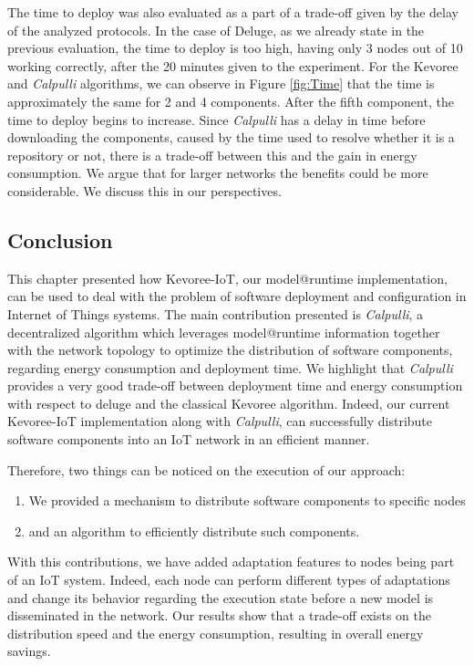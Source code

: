 The time to deploy was also evaluated as a part of a trade-off given by the delay of the analyzed protocols.
In the case of Deluge, as we already state in the previous evaluation, the time to deploy is too high, having only 3 nodes out of 10 working correctly, after the 20 minutes given to the experiment.
For the Kevoree and \textit{Calpulli} algorithms, we can observe in Figure \ref{fig:Time} that the time is approximately the same for 2 and 4 components.
After the fifth component, the time to deploy begins to increase. Since \textit{Calpulli} has a delay in time before downloading the components, caused by the time used to resolve whether it is a repository or not, there is a trade-off between this and the gain in energy consumption. We argue that for larger networks the benefits could be more considerable. We discuss this in our perspectives.

\subsection{Conclusion}
This chapter presented how Kevoree-IoT, our model@runtime implementation, can be used to deal with the problem of software deployment and configuration in Internet of Things systems. 
The main contribution presented is \textit{Calpulli}, a decentralized algorithm which leverages model@runtime information together with the network topology to optimize the distribution of software components, regarding energy consumption and deployment time. 
We highlight that \textit{Calpulli} provides a very good trade-off between deployment time and energy consumption with respect to deluge and the classical Kevoree algorithm.
Indeed, our current Kevoree-IoT implementation along with \textit{Calpulli}, can successfully distribute software components into an IoT network in an efficient manner.

Therefore, two things can be noticed on the execution of our approach:

\begin{enumerate}
	\item We provided a mechanism to distribute software components to specific nodes
	\item and an algorithm to efficiently distribute such components.
\end{enumerate}

With this contributions, we have added adaptation features to nodes being part of an IoT system.
Indeed, each node can perform different types of adaptations and change its behavior regarding the execution state before a new model is disseminated in the network.
Our results show that a trade-off exists on the distribution speed and the energy consumption, resulting in overall energy savings.